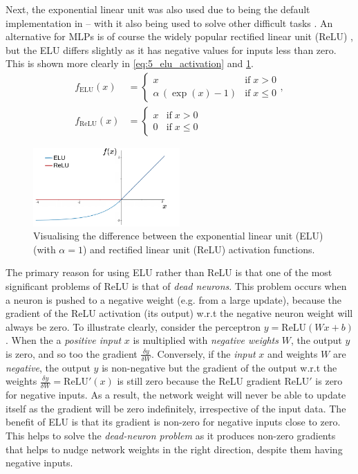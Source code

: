 Next, the exponential linear unit \cite{ELU} was also used due to being the default implementation in \cite{IsaacGym} -- with it also being used to solve other difficult tasks \cite{shadowHand, LearningWalkMassivelyParallel}. An alternative for MLPs is of course the widely popular rectified linear unit (ReLU) \cite{ReLU}, but the ELU differs slightly as it has negative values for inputs less than zero. This is shown more clearly in \eqref{eq:5_elu_activation} and \cref{fig:5_relu_elu}.
\begin{align}
        f_\text{ELU}(x) &= \begin{cases}
          x & \text{if} \; x > 0 \\
          \alpha \, (\exp{(x)} - 1) & \text{if} \; x \leq 0
        \end{cases}, \label{eq:5_elu_activation} \\
        f_\text{ReLU}(x) &= \begin{cases}
          x & \text{if} \; x > 0 \\
          0 & \text{if} \; x \leq 0
        \end{cases} \label{eq:5_relu_activation}
\end{align}
\begin{figure}[hbt]
    \centering
    \includegraphics[width=0.5\textwidth]{figures/5_/5_relu_elu.pdf}
    \caption{Visualising the difference between the exponential linear unit (ELU) (with $\alpha = 1$) and rectified linear unit (ReLU) activation functions.}
    \label{fig:5_relu_elu}
\end{figure}

The primary reason for using ELU rather than ReLU is that one of the most significant problems of ReLU is that of \textit{dead neurons}. This problem occurs when a neuron is pushed to a negative weight (e.g. from a large update), because the gradient of the ReLU activation (its output) w.r.t the negative neuron weight will always be zero. To illustrate clearly, consider the perceptron $y = \text{ReLU}(Wx + b)$. When the a \textit{positive input} $x$ is multiplied with \textit{negative weights} $W$, the output $y$ is zero, and so too the gradient $\frac{\delta y}{\delta W}$. 
Conversely, if the \textit{input} $x$ and weights $W$ are \textit{negative}, the output $y$ is non-negative but the gradient of the output w.r.t the weights $\frac{\delta y}{\delta W} = \text{ReLU}' (x)$ is still zero because the ReLU gradient $\text{ReLU}'$ is zero for negative inputs.
As a result, the network weight will never be able to update itself as the gradient will be zero indefinitely, irrespective of the input data.
The benefit of ELU is that its gradient is non-zero for negative inputs close to zero. This helps to solve the \textit{dead-neuron problem} as it produces non-zero gradients that helps to nudge network weights in the right direction, despite them having negative inputs. 

